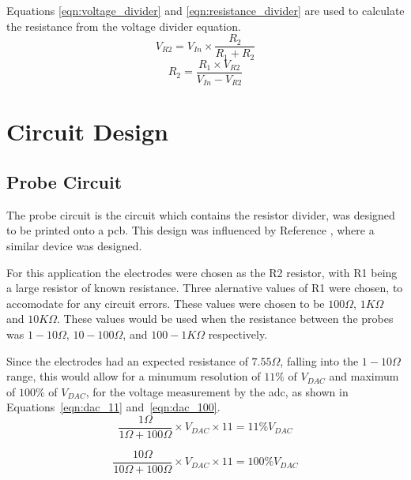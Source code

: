 Equations \ref{eqn:voltage_divider} and \ref{eqn:resistance_divider} are used to calculate the resistance from the voltage divider equation.
\begin{equation}\label{eqn:voltage_divider}
    V_{R2} = V_{In} \times \frac{R_2}{R_1 + R_2}
\end{equation}
\begin{equation}\label{eqn:resistance_divider}
    R_2 = \frac{R_1 \times V_{R2}}{V_{In}-V_{R2}}
\end{equation}


\section{Circuit Design}
\subsection{Probe Circuit}
The probe circuit is the circuit which contains the resistor divider, was designed to be printed onto a \gls{pcb}.
This design was influenced by Reference \cite{cam_clark}, where a similar device was designed.





For this application the electrodes were chosen as the R2 resistor, with R1 being a large resistor of known resistance.
Three alernative values of R1 were chosen, to accomodate for any circuit errors.
These values were chosen to be $100\Omega$, $1K\Omega$ and $10K\Omega$.
These values would be used when the resistance between the probes was $1-10\Omega$, $10-100\Omega$, and $100-1K\Omega$ respectively.

Since the electrodes had an expected resistance of $7.55\Omega$, falling into the $1-10\Omega$ range, this would allow for a minumum resolution of $11\%$ of $V_{DAC}$ and maximum of $100\%$ of $V_{DAC}$, for the voltage measurement by the \gls{adc}, as shown in Equations~\ref{eqn:dac_11} and~\ref{eqn:dac_100}.
\begin{equation}\label{eqn:dac_11}
    \frac{1\Omega}{1\Omega + 100\Omega}\times V_{DAC} \times 11 = 11\% V_{DAC}
\end{equation}

\begin{equation}\label{eqn:dac_100}
    \frac{10\Omega}{10\Omega + 100\Omega}\times V_{DAC} \times 11 = 100\% V_{DAC}
\end{equation}
